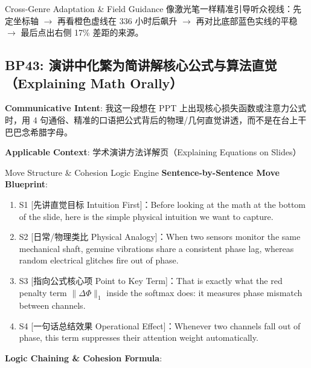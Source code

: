 \endgroup
\vspace{4pt}
\begin{TipBox}{Cross-Genre Adaptation \& Field Guidance}
像激光笔一样精准引导听众视线：先定坐标轴 $\to$ 再看橙色虚线在 336 小时后飙升 $\to$ 再对比底部蓝色实线的平稳 $\to$ 最后点出右侧 17\% 差距的来源。
\end{TipBox}
\vspace{8pt}
\subsection{BP43: 演讲中化繁为简讲解核心公式与算法直觉（Explaining Math Orally）}\label{sec:bp:BP43}
\noindent\textbf{\color{AcadNavy}Communicative Intent}: 我这一段想在 PPT 上出现核心损失函数或注意力公式时，用 4 句通俗、精准的口语把公式背后的物理/几何直觉讲透，而不是在台上干巴巴念希腊字母。\par\vspace{2pt}
\noindent\textbf{\color{AcadSlate}Applicable Context}: 学术演讲方法详解页（Explaining Equations on Slides）\par\vspace{4pt}
\begin{ConceptBox}{Move Structure \& Cohesion Logic Engine}
\textbf{Sentence-by-Sentence Move Blueprint}:
\begin{enumerate}[label=\textbf{\color{AcadNavy}S\arabic*.}, leftmargin=2em, itemsep=2pt]
  \item S1 [先讲直觉目标 Intuition First]：Before looking at the math at the bottom of the slide, here is the simple physical intuition we want to capture.
  \item S2 [日常/物理类比 Physical Analogy]：When two sensors monitor the same mechanical shaft, genuine vibrations share a consistent phase lag, whereas random electrical glitches fire out of phase.
  \item S3 [指向公式核心项 Point to Key Term]：That is exactly what the red penalty term $\|\Delta \Phi\|_1$ inside the softmax does: it measures phase mismatch between channels.
  \item S4 [一句话总结效果 Operational Effect]：Whenever two channels fall out of phase, this term suppresses their attention weight automatically.
\end{enumerate}\par\vspace{4pt}
\textbf{Logic Chaining \& Cohesion Formula}:\par{}
\end{ConceptBox}

